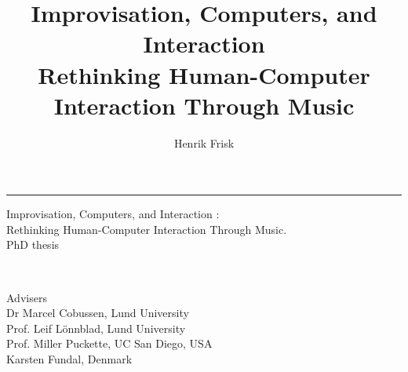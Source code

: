 \documentclass[a4paper]{book}
\title{\usefont{T1}{phv}{m}{n}Improvisation, Computers, and Interaction\\{\small Rethinking Human-Computer Interaction Through Music}}
\author{Henrik Frisk}
\date{}
\numberwithin{equation}{section}
\begin{document}
\pagestyle{empty}
\clearpage
% 

\rule{\linewidth}{0.4mm}
\vspace{2cm}

\begin{minipage}[l]{\linewidth}
  {\Large Improvisation, Computers, and Interaction :} \\
  {\normalsize Rethinking Human-Computer Interaction Through Music.}
  \\[0.1cm]
  PhD thesis
\end{minipage}
\\[3cm]

\begin{minipage}[l]{\linewidth}
Advisers
\\[.3cm]
Dr Marcel Cobussen, Lund University\\
Prof. Leif L\"{o}nnblad, Lund University\\
Prof. Miller Puckette, UC San Diego, USA\\
Karsten Fundal, Denmark
\end{minipage}
\end{document}
